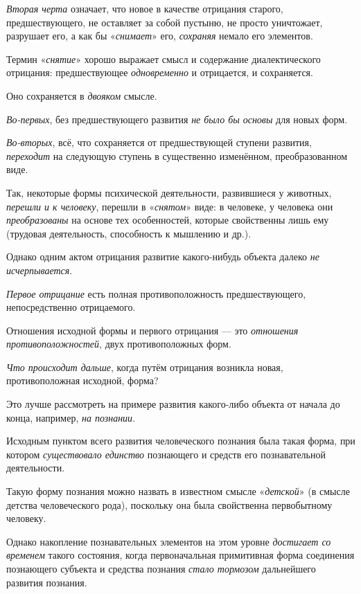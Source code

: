 \documentclass[a4paper,14pt,russian]{extreport}
\begin{document}
\emph{Вторая черта} означает, что новое в качестве отрицания старого, предшествующего, не оставляет за собой пустыню, не просто уничтожает, разрушает его, а как бы «\emph{снимает}» его, \emph{сохраняя} немало его элементов.

Термин «\emph{снятие}» хорошо выражает смысл и содержание диалектического отрицания: предшествующее \emph{одновременно} и отрицается, и сохраняется.

Оно сохраняется в \emph{двояком} смысле.

\emph{Во-первых}, без предшествующего развития \emph{не было бы основы} для новых форм.

\emph{Во-вторых}, всё, что сохраняется от предшествующей ступени развития, \emph{переходит} на следующую ступень в существенно изменённом, преобразованном виде.

Так, некоторые формы психической деятельности, развившиеся у животных, \emph{перешли и к человеку}, перешли в «\emph{снятом}» виде: в человеке, у человека они \emph{преобразованы} на основе тех особенностей, которые свойственны лишь ему (трудовая деятельность, способность к мышлению и др.).

Однако одним актом отрицания развитие какого-нибудь объекта далеко \emph{не исчерпывается}.

\emph{Первое отрицание} есть полная противоположность предшествующего, непосредственно отрицаемого.

Отношения исходной формы и первого отрицания --- это \emph{отношения противоположностей}, двух противоположных форм.

\emph{Что происходит дальше}, когда путём отрицания возникла новая, противоположная исходной, форма?

Это лучше рассмотреть на примере развития какого-либо объекта от начала до конца, например, \emph{на познании}.

Исходным пунктом всего развития человеческого познания была такая форма, при котором \emph{существовало единство} познающего и средств его познавательной деятельности.

Такую форму познания можно назвать в известном смысле «\emph{детской}» (в смысле детства человеческого рода), поскольку она была свойственна первобытному человеку.

Однако накопление познавательных элементов на этом уровне \emph{достигает со временем} такого состояния, когда первоначальная примитивная форма соединения познающего субъекта и средства познания \emph{стало тормозом} дальнейшего развития познания.
\end{document}
